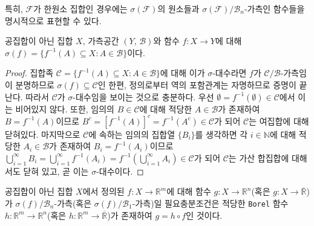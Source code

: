 특히, $\mathcal{F}$가 한원소 집합인 경우에는 $\sigma(\mathcal{F})$의 원소들과 $\sigma(\mathcal{F})/\mathcal{B}_n$-가측인 함수들을 명시적으로 표현할 수 있다.

\begin{theorem}\label{thm:functionGeneratedSigmaAlgebra}
    공집합이 아닌 집합 $X$, 가측공간 $(Y,\,\mathcal{B})$와 함수 $f:X\to Y$에 대해 $\sigma(f)=\{f^{-1}(A)\subseteq X:A\in\mathcal{B}\}$이다.
\end{theorem}

\begin{proof}
    집합족 $\mathcal{C}=\{f^{-1}(A)\subseteq X:A\in\mathcal{B}\}$에 대해 이가 $\sigma$-대수라면 $f$가 $\mathcal{C}/\mathcal{B}$-가측임이 분명하므로 $\sigma(f)\subseteq\mathcal{C}$인 한편, 정의로부터 역의 포함관계는 자명하므로 증명이 끝난다. 따라서 $\mathcal{C}$가 $\sigma$-대수임을 보이는 것으로 충분하다. 우선 $\emptyset = f^{-1}(\emptyset)\in\mathcal{C}$에서 이는 비어있지 않다. 또한, 임의의 $B\in\mathcal{C}$에 대해 적당한 $A\in\mathcal{B}$가 존재하여 $B=f^{-1}(A)$이므로 $B^c=[f^{-1}(A)]^c=f^{-1}(A^c)\in\mathcal{C}$가 되어 $\mathcal{C}$는 여집합에 대해 닫혀있다. 마지막으로 $\mathcal{C}$에 속하는 임의의 집합열 $\{B_i\}$를 생각하면 각 $i\in\mathbb{N}$에 대해 적당한 $A_i\in\mathcal{B}$가 존재하여 $B_i=f^{-1}(A_i)$이므로 $\bigcup_{i=1}^\infty B_i=\bigcup_{i=1}^\infty f^{-1}(A_i)=f^{-1}(\bigcup_{i=1}^\infty A_i)\in\mathcal{C}$가 되어 $\mathcal{C}$는 가산 합집합에 대해서도 닫혀 있고, 곧 이는 $\sigma$-대수이다.
\end{proof}

\begin{theorem}
    공집합이 아닌 집합 $X$에서 정의된 $f:X\to\mathbb{R}^m$에 대해 함수 $g:X\to\mathbb{R}^n$(혹은 $g:X\to\overline{\mathbb{R}}$)가 $\sigma(f)/\mathcal{B}_n$-가측(혹은 $\sigma(f)/\mathcal{B}_1$-가측)일 필요충분조건은 적당한 \texttt{Borel} 함수 $h:\mathbb{R}^m\to\mathbb{R}^n$(혹은 $h:\mathbb{R}^m\to\overline{\mathbb{R}}$)가 존재하여 $g=h\circ f$인 것이다.
\end{theorem}


